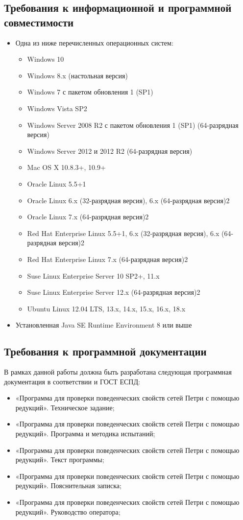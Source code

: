 \documentclass{../TechDoc}
\begin{document}
	\subsection{Требования к информационной и программной совместимости}
	\begin{itemize}
		\item Одна из ниже перечисленных операционных систем\cite{javareq}:
		\begin{itemize}
			\item Windows 10
			\item Windows 8.x (настольная версия)
			\item Windows 7 с пакетом обновления 1 (SP1)
			\item Windows Vista SP2
			\item Windows Server 2008 R2 с пакетом обновления 1 (SP1) (64-разрядная версия)
			\item Windows Server 2012 и 2012 R2 (64-разрядная версия)
			\item Mac OS X 10.8.3+, 10.9+
			\item Oracle Linux 5.5+1
			\item Oracle Linux 6.x (32-разрядная версия), 6.x (64-разрядная версия)2
			\item Oracle Linux 7.x (64-разрядная версия)2
			\item Red Hat Enterprise Linux 5.5+1, 6.x (32-разрядная версия), 6.x (64-разрядная версия)2
			\item Red Hat Enterprise Linux 7.x (64-разрядная версия)2
			\item Suse Linux Enterprise Server 10 SP2+, 11.x
			\item Suse Linux Enterprise Server 12.x (64-разрядная версия)2
			\item Ubuntu Linux 12.04 LTS, 13.x, 14.x, 15.x, 16.x, 18.x
		\end{itemize}
		\item Установленная Java SE Runtime Environment 8\cite{Java} или выше
	\end{itemize}
	\subsection{Требования к программной документации}
	В рамках данной работы должна быть разработана следующая программная документация в соответствии и ГОСТ ЕСПД:
	\begin{itemize}
		\item «Программа для проверки поведенческих свойств сетей Петри с помощью редукций». Техническое задание\cite{TZbook};
		\item «Программа для проверки поведенческих свойств сетей Петри с помощью редукций». Программа и методика испытаний\cite{TESTbook};
		\item «Программа для проверки поведенческих свойств сетей Петри с помощью редукций». Текст программы\cite{SourceCodeBook};
		\item «Программа для проверки поведенческих свойств сетей Петри с помощью редукций». Пояснительная записка\cite{PZbook};
		\item «Программа для проверки поведенческих свойств сетей Петри с помощью редукций». Руководство оператора\cite{Operatorbook};
	\end{itemize}
\end{document}
